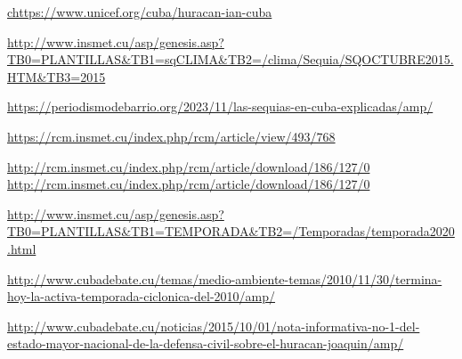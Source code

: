 \documentclass[12pt]{article}
\begin{document}
\newpage
\begin{thebibliography}{8}
	\url{chttps://www.unicef.org/cuba/huracan-ian-cuba}
	
	\url{http://www.insmet.cu/asp/genesis.asp?TB0=PLANTILLAS&TB1=sqCLIMA&TB2=/clima/Sequia/SQOCTUBRE2015.HTM&TB3=2015}
	
	\url{https://periodismodebarrio.org/2023/11/las-sequias-en-cuba-explicadas/amp/}
	
	\url{https://rcm.insmet.cu/index.php/rcm/article/view/493/768}
	
	\url{http://rcm.insmet.cu/index.php/rcm/article/download/186/127/0
		http://rcm.insmet.cu/index.php/rcm/article/download/186/127/0}
	
	\url{http://www.insmet.cu/asp/genesis.asp?TB0=PLANTILLAS&TB1=TEMPORADA&TB2=/Temporadas/temporada2020.html}
	
	\url{http://www.cubadebate.cu/temas/medio-ambiente-temas/2010/11/30/termina-hoy-la-activa-temporada-ciclonica-del-2010/amp/}
	
	\url{http://www.cubadebate.cu/noticias/2015/10/01/nota-informativa-no-1-del-estado-mayor-nacional-de-la-defensa-civil-sobre-el-huracan-joaquin/amp/}
		
\end{thebibliography}
\end{document}
